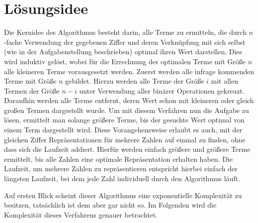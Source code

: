 \documentclass{article}
\theoremstyle{nonumberplain}
\begin{document}

\section{Lösungsidee}

Die Kernidee des Algorithmus besteht darin, alle Terme zu ermitteln, die durch \(n\)-fache Verwendung der gegebenen Ziffer und deren Verknüpfung mit sich selbst (wie in der Aufgabenstellung beschrieben) optimal ihren Wert darstellen.
Dies wird induktiv gelöst, wobei für die Errechnung der optimalen Terme mit Größe \(n\) alle kleineren Terme vorausgesetzt werden.
Zuerst werden alle infrage kommenden Terme mit Größe \(n\) gebildet. Hierzu werden alle Terme der Größe \(i\) mit allen Termen der Größe \(n-i\) unter Verwendung aller binärer Operationen gekreuzt.
Daraufhin werden alle Terme entfernt, deren Wert schon mit kleineren oder gleich großen Termen dargestellt wurde.
Um mit diesem Verfahren nun die Aufgabe zu lösen, ermittelt man solange größere Terme, bis der gesuchte Wert optimal von einem Term dargestellt wird.
Diese Vorangehensweise erlaubt es auch, mit der gleichen Ziffer Repräsentationen für mehrere Zahlen auf einmal zu finden, ohne dass sich die Laufzeit addiert.
Hierfür werden einfach größere und größere Terme ermittelt, bis alle Zahlen eine optimale Repräsentation erhalten haben.
Die Laufzeit, um mehrere Zahlen zu repräsentieren entspricht hierbei einfach der längsten Laufzeit, bei dem jede Zahl individuell durch den Algorithmus läuft.

Auf ersten Blick scheint dieser Algorithmus eine exponentielle Komplexität zu besitzen, tatsächlich ist dem aber gar nicht so.
Im Folgenden wird die Komplexität dieses Verfahrens genauer betrachtet.

\newcommand{\fad}{\forall d, B:\ }
\newcommand{\measure}[1]{\Phi_{d}^{B}(#1)}
\end{document}

